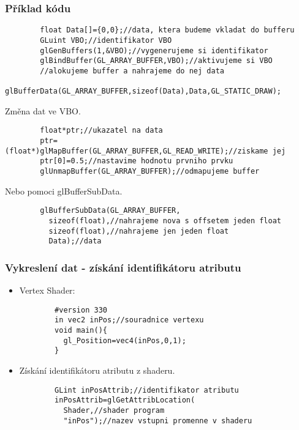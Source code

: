 \begin{frame}[fragile]
\frametitle{Příklad kódu}
	\begin{itemize}
		{\scriptsize
		\begin{verbatim}
		float Data[]={0,0};//data, ktera budeme vkladat do bufferu
		GLuint VBO;//identifikator VBO
		glGenBuffers(1,&VBO);//vygenerujeme si identifikator
		glBindBuffer(GL_ARRAY_BUFFER,VBO);//aktivujeme si VBO
		//alokujeme buffer a nahrajeme do nej data
		glBufferData(GL_ARRAY_BUFFER,sizeof(Data),Data,GL_STATIC_DRAW);
		\end{verbatim}
		}
		Změna dat ve VBO.
		{\scriptsize
		\begin{verbatim}
		float*ptr;//ukazatel na data
		ptr=(float*)glMapBuffer(GL_ARRAY_BUFFER,GL_READ_WRITE);//ziskame jej
		ptr[0]=0.5;//nastavime hodnotu prvniho prvku
		glUnmapBuffer(GL_ARRAY_BUFFER);//odmapujeme buffer
		\end{verbatim}
		}
		Nebo pomoci {\color{blue} glBufferSubData}.
		{\scriptsize
		\begin{verbatim}
		glBufferSubData(GL_ARRAY_BUFFER,
		  sizeof(float),//nahrajeme nova s offsetem jeden float
		  sizeof(float),//nahrajeme jen jeden float
		  Data);//data
		\end{verbatim}
		}

	\end{itemize}
\end{frame}

\begin{frame}[fragile]
\frametitle{Vykreslení dat - získání identifikátoru atributu}
	\begin{itemize}
		\item{Vertex Shader:
		{\scriptsize
		\begin{verbatim}
		#version 330
		in vec2 inPos;//souradnice vertexu
		void main(){
		  gl_Position=vec4(inPos,0,1);
		}
		\end{verbatim}
		}}

		\item{Získání identifikátoru atributu z shaderu.
		{\scriptsize
		\begin{verbatim}
		GLint inPosAttrib;//identifikator atributu
		inPosAttrib=glGetAttribLocation(
		  Shader,//shader program
		  "inPos");//nazev vstupni promenne v shaderu
		\end{verbatim}
		}}

	\end{itemize}
\end{frame}

